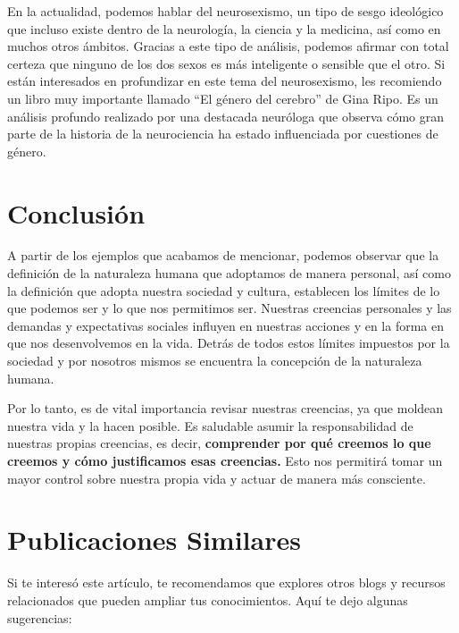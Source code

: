 \documentclass[
  a4paper,
]{article}
\begin{document}
En la actualidad, podemos hablar del neurosexismo, un tipo de sesgo
ideológico que incluso existe dentro de la neurología, la ciencia y la
medicina, así como en muchos otros ámbitos. Gracias a este tipo de
análisis, podemos afirmar con total certeza que ninguno de los dos sexos
es más inteligente o sensible que el otro. Si están interesados en
profundizar en este tema del neurosexismo, les recomiendo un libro muy
importante llamado ``El género del cerebro'' de Gina Ripo. Es un
análisis profundo realizado por una destacada neuróloga que observa cómo
gran parte de la historia de la neurociencia ha estado influenciada por
cuestiones de género.

\section{Conclusión}\label{conclusiuxf3n}

A partir de los ejemplos que acabamos de mencionar, podemos observar que
la definición de la naturaleza humana que adoptamos de manera personal,
así como la definición que adopta nuestra sociedad y cultura, establecen
los límites de lo que podemos ser y lo que nos permitimos ser. Nuestras
creencias personales y las demandas y expectativas sociales influyen en
nuestras acciones y en la forma en que nos desenvolvemos en la vida.
Detrás de todos estos límites impuestos por la sociedad y por nosotros
mismos se encuentra la concepción de la naturaleza humana.

Por lo tanto, es de vital importancia revisar nuestras creencias, ya que
moldean nuestra vida y la hacen posible. Es saludable asumir la
responsabilidad de nuestras propias creencias, es decir,
\textbf{comprender por qué creemos lo que creemos y cómo justificamos
esas creencias.} Esto nos permitirá tomar un mayor control sobre nuestra
propia vida y actuar de manera más consciente.

\section{Publicaciones Similares}\label{publicaciones-similares}

Si te interesó este artículo, te recomendamos que explores otros blogs y
recursos relacionados que pueden ampliar tus conocimientos. Aquí te dejo
algunas sugerencias:
\end{document}
